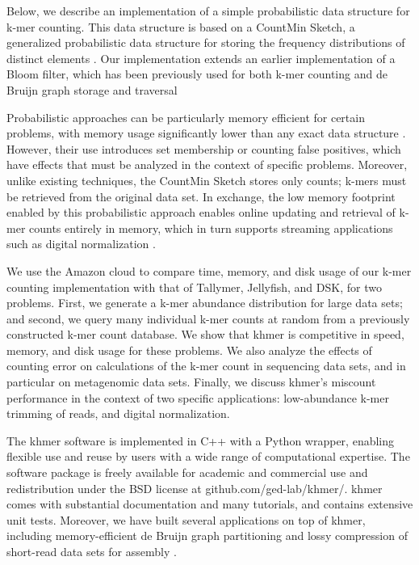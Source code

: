 \documentclass[10pt]{article}
\begin{document}

Below, we describe an implementation of a simple probabilistic data
structure for k-mer counting.  This data structure is based on a
CountMin Sketch, a generalized probabilistic data structure for
storing the frequency distributions of distinct elements
\cite{Cormode2005}.  Our implementation extends an earlier
implementation of a Bloom filter, which has been previously used for
both k-mer counting and de Bruijn graph storage and traversal
\cite{Bloom70,BroderM03,Melsted2011,Pell2012,Rizk2013,Jones:2012aa}

Probabilistic approaches can be particularly memory efficient for
certain problems, with memory usage significantly lower than any exact
data structure \cite{Pell2012}.  However, their use introduces set
membership or counting false positives, which have effects that must
be analyzed in the context of specific problems.  Moreover, unlike
existing techniques, the CountMin Sketch stores only counts;
k-mers must be retrieved from the original data set.  In exchange,
the low memory footprint enabled by this probabilistic approach enables
online updating and retrieval of k-mer counts entirely in memory, which
in turn supports streaming applications such as digital normalization
\cite{Brown2012}.

We use the Amazon cloud to compare time, memory, and disk usage of our k-mer counting
implementation with that of Tallymer, Jellyfish, and DSK, for two problems. First, we 
generate a k-mer abundance distribution for large
data sets; and second, we query many individual k-mer counts at random from
a previously constructed k-mer count database.  We show that khmer
is competitive in speed, memory, and disk usage for these
problems.  We also analyze the effects of counting error on
calculations of the k-mer count in sequencing data sets,
and in particular on metagenomic data sets.  Finally, we discuss
khmer's miscount performance in the context of two specific applications:
low-abundance k-mer trimming of reads, and digital normalization.


The khmer software is implemented in C++ with a Python wrapper,
enabling flexible use and reuse by users with a wide range of
computational
expertise.  The software package is freely available for academic and
commercial use and redistribution under the BSD license at
github.com/ged-lab/khmer/.  khmer comes with substantial documentation
and many tutorials, and contains extensive unit tests.  Moreover, we
have built several applications on top of khmer, including
memory-efficient de Bruijn graph partitioning \cite{Pell2012} and
lossy compression of short-read data sets for assembly
\cite{Brown2012}.
\end{document}

